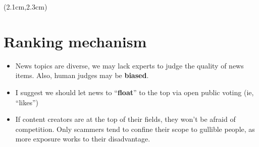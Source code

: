 \begin{preview}
\begin{textblock*}{5cm}(2.1cm,2.3cm) %
	{\color{red}{\large \textcircled{\small \themypage}}}
	\addtocounter{mypage}{1}
\end{textblock*}

\begin{minipage}{\textwidth}
	\setlength{\parskip}{0.4\baselineskip}

\section{Ranking mechanism}

\begin{itemize}
	\item News topics are diverse, we may lack experts to judge the quality of news items. Also, human judges may be \textbf{biased}.
	\item I suggest we should let news to ``\textbf{float}'' to the top via open public voting (ie, ``likes'')
	\item If content creators are at the top of their fields, they won't be afraid of competition.  Only scammers tend to confine their scope to gullible people, as more exposure works to their disadvantage.
\end{itemize}

\end{minipage}
\end{preview}


